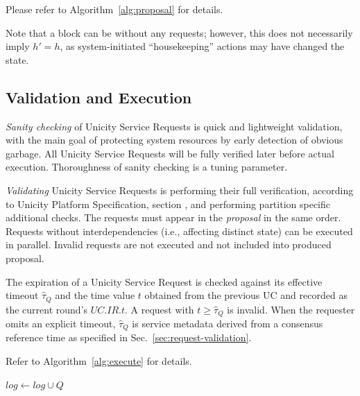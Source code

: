 Please refer to Algorithm~\ref{alg:proposal} for details.

Note that a block can be without any requests; however, this does not necessarily imply $h' = h$, as system-initiated ``housekeeping'' actions may have changed the state.

\subsection{Validation and Execution}\label{validation-state-update}

\emph{Sanity checking} of Unicity Service Requests is quick and lightweight validation, with the main goal of protecting system resources by early detection of obvious garbage. All Unicity Service Requests will be fully verified later before actual execution. Thoroughness of sanity checking is a tuning parameter.

\emph{Validating} Unicity Service Requests is performing their full verification, according to Unicity Platform Specification, section , and performing partition specific additional checks. The requests must appear in the \emph{proposal} in the same order. Requests without interdependencies (i.e., affecting distinct state) can be executed in parallel. Invalid requests are not executed and not included into produced proposal.

The expiration of a Unicity Service Request is checked against its effective timeout $\widehat\tau_Q$ and the time value $t$ obtained from the previous UC and recorded as the current round's $UC.IR.t$. A request with $t \ge \widehat\tau_Q$ is invalid. When the requester omits an explicit timeout, $\widehat\tau_Q$ is service metadata derived from a consensus reference time as specified in Sec.~\ref{sec:request-validation}.

Refer to Algorithm~\ref{alg:execute} for details.

\begin{algorithm}[tb]
  \caption{Validate and Execute Unicity Service Requests}\label{alg:execute}
  \begin{algorithmic}[0]
      
      \State {}  
    \EndFunction
    \State
      \State {}
    \EndFunction
    \State
       
          \State {}   
          \State $log \gets log \cup Q$
        \EndIf
      \EndFor
    \EndFunction
  \end{algorithmic}
\end{algorithm}



